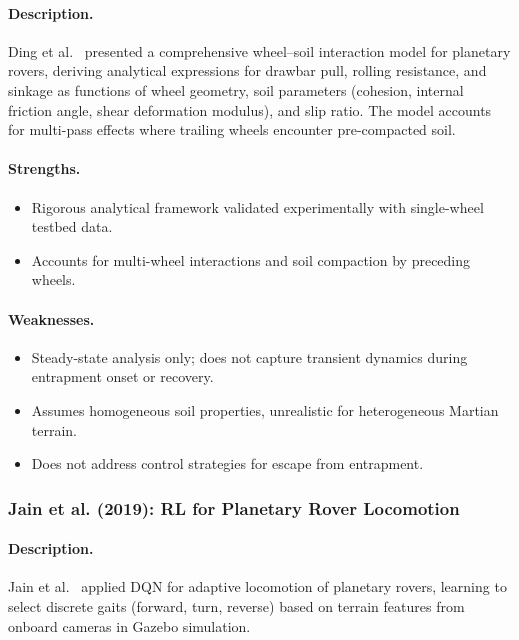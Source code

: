 \documentclass[12pt,a4paper]{article}
\begin{document}
\paragraph{Description.} Ding et al.~\cite{ding2011} presented a comprehensive wheel--soil interaction model for planetary rovers, deriving analytical expressions for drawbar pull, rolling resistance, and sinkage as functions of wheel geometry, soil parameters (cohesion, internal friction angle, shear deformation modulus), and slip ratio. The model accounts for multi-pass effects where trailing wheels encounter pre-compacted soil.

\paragraph{Strengths.}
\begin{itemize}
    \item Rigorous analytical framework validated experimentally with single-wheel testbed data.
    \item Accounts for multi-wheel interactions and soil compaction by preceding wheels.
\end{itemize}

\paragraph{Weaknesses.}
\begin{itemize}
    \item Steady-state analysis only; does not capture transient dynamics during entrapment onset or recovery.
    \item Assumes homogeneous soil properties, unrealistic for heterogeneous Martian terrain.
    \item Does not address control strategies for escape from entrapment.
\end{itemize}


\subsubsection{Jain et al. (2019): RL for Planetary Rover Locomotion}

\paragraph{Description.} Jain et al.~\cite{jain2019} applied DQN for adaptive locomotion of planetary rovers, learning to select discrete gaits (forward, turn, reverse) based on terrain features from onboard cameras in Gazebo simulation.
\end{document}
